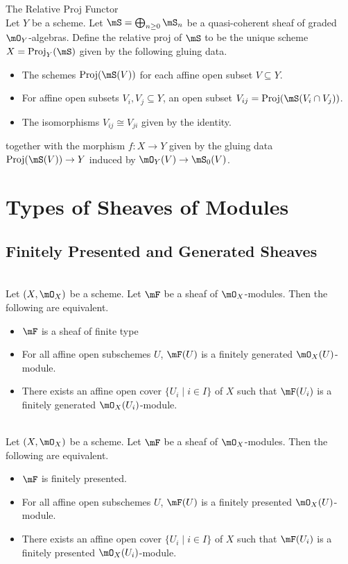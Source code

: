 \documentclass[a4paper]{article}
\begin{document}
\begin{defn}{The Relative Proj Functor}{}\\
Let $Y$ be a scheme. Let $\mS=\bigoplus_{n\geq 0}\mS_n$ be a quasi-coherent sheaf of graded $\mO_Y$-algebras. Define the relative proj of $\mS$ to be the unique scheme $X=\text{Proj}_Y(\mS)$ given by the following gluing data.
\begin{itemize}
\item The schemes $\text{Proj}(\mS(V))$ for each affine open subset $V\subseteq Y$.
\item For affine open subsets $V_i,V_j\subseteq Y$, an open subset $V_{ij}=\text{Proj}(\mS(V_i\cap V_j))$.
\item The isomorphisms $V_{ij}\cong V_{ji}$ given by the identity.
\end{itemize}
together with the morphism $f:X\to Y$ given by the gluing data $\text{Proj}(\mS(V))\to Y$ induced by $\mO_Y(V)\to\mS_0(V)$.
\end{defn}

\pagebreak
\section{Types of Sheaves of Modules}
\subsection{Finitely Presented and Generated Sheaves}
\begin{prp}{}{}\\
Let $(X,\mO_X)$ be a scheme. Let $\mF$ be a sheaf of $\mO_X$-modules. Then the following are equivalent. 
\begin{itemize}
\item $\mF$ is a sheaf of finite type
\item For all affine open subschemes $U$, $\mF(U)$ is a finitely generated $\mO_X(U)$-module. 
\item There exists an affine open cover $\{U_i\;|\;i\in I\}$ of $X$ such that $\mF(U_i)$ is a finitely generated $\mO_X(U_i)$-module. 
\end{itemize}
\end{prp}

\begin{prp}{}{}\\
Let $(X,\mO_X)$ be a scheme. Let $\mF$ be a sheaf of $\mO_X$-modules. Then the following are equivalent. 
\begin{itemize}
\item $\mF$ is finitely presented. 
\item For all affine open subschemes $U$, $\mF(U)$ is a finitely presented $\mO_X(U)$-module. 
\item There exists an affine open cover $\{U_i\;|\;i\in I\}$ of $X$ such that $\mF(U_i)$ is a finitely presented $\mO_X(U_i)$-module. 
\end{itemize}
\end{prp}
\end{document}
